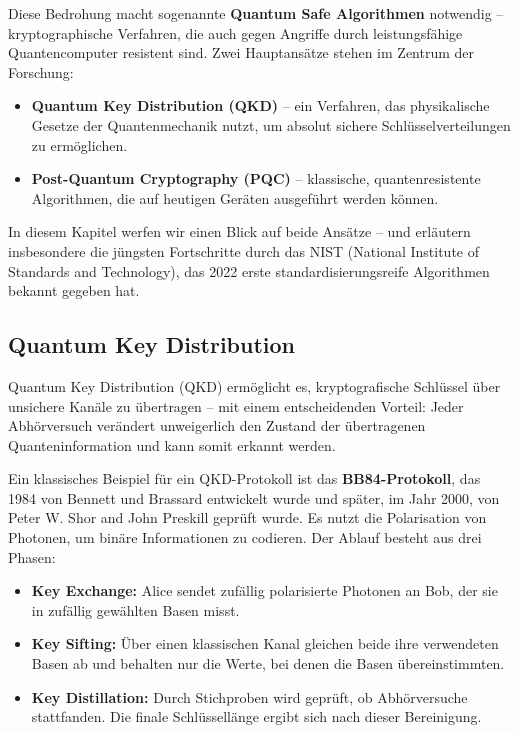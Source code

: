 Diese Bedrohung macht sogenannte \textbf{Quantum Safe Algorithmen} notwendig – kryptographische Verfahren, die auch gegen Angriffe durch leistungsfähige Quantencomputer resistent sind. Zwei Hauptansätze stehen im Zentrum der Forschung:

\begin{itemize}
  \item \textbf{Quantum Key Distribution (QKD)} – ein Verfahren, das physikalische Gesetze der Quantenmechanik nutzt, um absolut sichere Schlüsselverteilungen zu ermöglichen.
  \item \textbf{Post-Quantum Cryptography (PQC)} – klassische, quantenresistente Algorithmen, die auf heutigen Geräten ausgeführt werden können.
\end{itemize}

In diesem Kapitel werfen wir einen Blick auf beide Ansätze – und erläutern insbesondere die jüngsten Fortschritte durch das NIST (National Institute of Standards and Technology), das 2022 erste standardisierungsreife Algorithmen bekannt gegeben hat.

\subsection{Quantum Key Distribution}

Quantum Key Distribution (QKD) ermöglicht es, kryptografische Schlüssel über unsichere Kanäle zu übertragen – mit einem entscheidenden Vorteil: Jeder Abhörversuch verändert unweigerlich den Zustand der übertragenen Quanteninformation und kann somit erkannt werden.

Ein klassisches Beispiel für ein QKD-Protokoll ist das \textbf{BB84-Protokoll}, das 1984 von Bennett und Brassard entwickelt wurde und später, im Jahr 2000, von Peter W. Shor and John Preskill geprüft wurde. Es nutzt die Polarisation von Photonen, um binäre Informationen zu codieren. Der Ablauf besteht aus drei Phasen:

\begin{itemize}
  \item \textbf{Key Exchange:} Alice sendet zufällig polarisierte Photonen an Bob, der sie in zufällig gewählten Basen misst.
  \item \textbf{Key Sifting:} Über einen klassischen Kanal gleichen beide ihre verwendeten Basen ab und behalten nur die Werte, bei denen die Basen übereinstimmten.
  \item \textbf{Key Distillation:} Durch Stichproben wird geprüft, ob Abhörversuche stattfanden. Die finale Schlüssellänge ergibt sich nach dieser Bereinigung.
\end{itemize}

